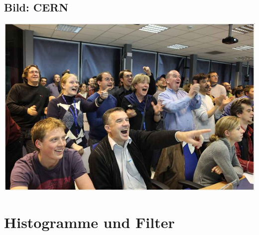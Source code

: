 \subsection{Bild: CERN}
\begin{frame}



\begin{minipage}{0.49\textwidth}
  \end{minipage}  \begin{minipage}{0.49\textwidth}

\includegraphics[width=\textwidth]{Figures Lecture on Datanalysis/ATLAS_Energy_People.jpg}
\end{minipage}
\end{frame}



    
\section{Histogramme und Filter}

    




